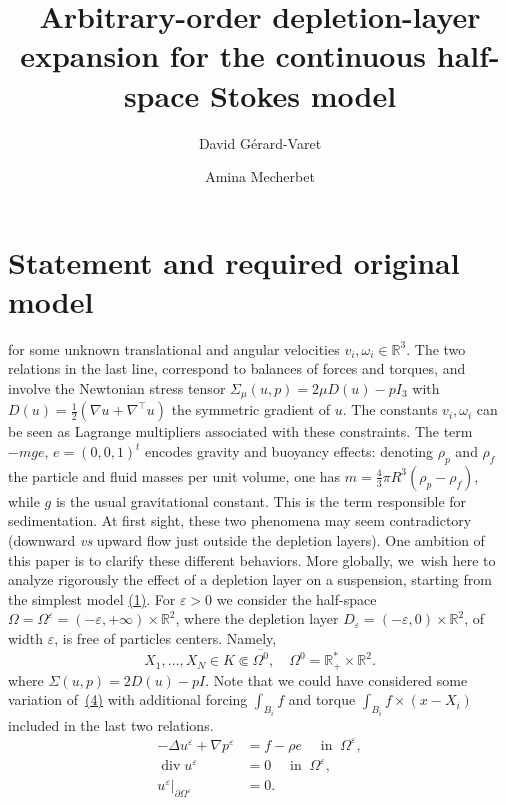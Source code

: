 \documentclass[10pt,a4paper]{amsart}
\renewcommand{\div}{\operatorname{div}}
\theoremstyle{plain}
\theoremstyle{definition}
\let\pa\partial
\let\na\nabla
\let\eps\varepsilon
\newcommand{\R}{\mathbb{R}}
\begin{document}
\title[Half-space Stokes depletion-layer expansion]{Arbitrary-order depletion-layer expansion for the continuous half-space Stokes model}
\author{David Gérard-Varet\and Amina Mecherbet}
\date{}\maketitle\section{Statement and required original model}
for some unknown translational and angular velocities $v_i, \omega_i \in \R^3$. The two relations in the last line, correspond to balances of forces and torques, and involve the Newtonian stress tensor $\Sigma_\mu(u,p) = 2\mu D(u) - p I_3$ with $D(u)=\frac{1}{2}(\nabla u + \nabla^\top u)$ the symmetric gradient of $u$. The constants $v_i, \omega_i$ can be seen as Lagrange multipliers associated with these constraints. The term $-mge$, $e = (0,0,1)^t$ encodes gravity and buoyancy effects: denoting $\rho_p$ and $\rho_f$ the particle and fluid masses per unit volume, one has $m = \frac{4}{3} \pi R^3 (\rho_p - \rho_f)$, while $g$ is the usual gravitational constant. This is the term responsible for sedimentation.
At first sight, these two phenomena may seem contradictory (downward {\it vs} upward flow just outside the depletion layers). One ambition of this paper is to clarify these different behaviors. More globally, we~wish here to analyze rigorously the effect of a depletion layer on a suspension, starting from the simplest model \href{https://jep.centre-mersenne.org/item/10.5802/jep.296.pdf#page=3}{(1)}. For $\eps > 0$ we consider the half-space $\Omega = \Omega^\eps = (-\eps,+\infty) \times \R^2$, where the depletion layer $D_\eps = (-\eps,0) \times \R^2$, of width $\eps$, is free of particles centers. Namely,
\begin{equation} \label{eq_assumption}
X_1, \dots, X_N \in K \Subset \overline{\Omega^0}, \quad \Omega^0 = \R^*_+ \times \R^2.
\end{equation}
where $\Sigma(u,p) = 2D(u) - p I$. Note that we could have considered some variation of~\href{https://jep.centre-mersenne.org/item/10.5802/jep.296.pdf#page=5}{(4)} with additional forcing $\int_{B_i} f$ and torque $\int_{B_i} f \times (x-X_i)$ included in the last two relations.
\setcounter{equation}{4}
\begin{equation} \label{limit_equation}
\begin{aligned}
-\Delta u^\eps + \na p^\eps & = f - \rho e \quad \text{ in } \: \Omega^\eps, \\
\div u^\eps & = 0 \quad \text{ in } \: \Omega^\eps, \\
u^\eps \vert_{\pa \Omega^\eps} & = 0.
\end{aligned}
\end{equation}
\end{document}
